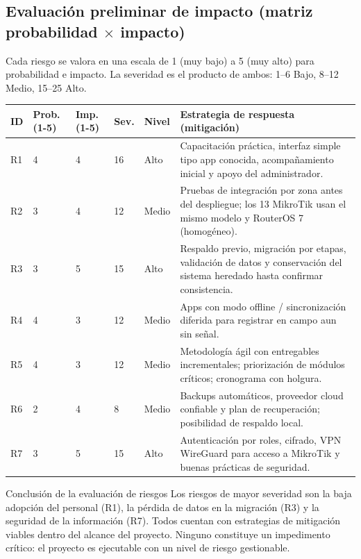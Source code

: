 \subsection{Evaluación preliminar de impacto (matriz probabilidad $\times$ impacto)}

Cada riesgo se valora en una escala de 1 (muy bajo) a 5 (muy alto) para probabilidad
e impacto. La severidad es el producto de ambos: 1--6 Bajo, 8--12 Medio, 15--25 Alto.

\begin{center}
\label{tab:riesgos-matriz}
{\small
\begin{tabularx}{\textwidth}{C{0.8cm} C{0.9cm} C{0.9cm} C{0.9cm} L{1.4cm} X}
\toprule
\textbf{ID} & \textbf{Prob. (1-5)} & \textbf{Imp. (1-5)} & \textbf{Sev.} &
\textbf{Nivel} & \textbf{Estrategia de respuesta (mitigación)} \\
\midrule
R1 & 4 & 4 & 16 & Alto &
Capacitación práctica, interfaz simple tipo app conocida, acompañamiento inicial y
apoyo del administrador. \\
R2 & 3 & 4 & 12 & Medio &
Pruebas de integración por zona antes del despliegue; los 13 MikroTik usan el mismo
modelo y RouterOS 7 (homogéneo). \\
R3 & 3 & 5 & 15 & Alto &
Respaldo previo, migración por etapas, validación de datos y conservación del sistema
heredado hasta confirmar consistencia. \\
R4 & 4 & 3 & 12 & Medio &
Apps con modo offline / sincronización diferida para registrar en campo aun sin señal. \\
R5 & 4 & 3 & 12 & Medio &
Metodología ágil con entregables incrementales; priorización de módulos críticos;
cronograma con holgura. \\
R6 & 2 & 4 & 8 & Medio &
Backups automáticos, proveedor cloud confiable y plan de recuperación; posibilidad de
respaldo local. \\
R7 & 3 & 5 & 15 & Alto &
Autenticación por roles, cifrado, VPN WireGuard para acceso a MikroTik y buenas
prácticas de seguridad. \\
\bottomrule
\end{tabularx}
}
\end{center}

\begin{upeubox}{Conclusión de la evaluación de riesgos}
Los riesgos de mayor severidad son la baja adopción del personal (R1), la pérdida de
datos en la migración (R3) y la seguridad de la información (R7). Todos cuentan con
estrategias de mitigación viables dentro del alcance del proyecto. Ninguno constituye
un impedimento crítico: el proyecto es ejecutable con un nivel de riesgo gestionable.
\end{upeubox}

